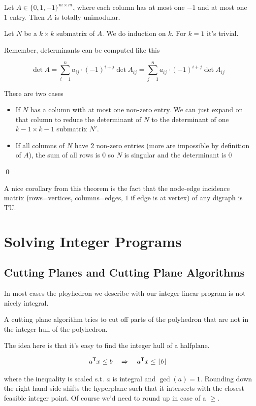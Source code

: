 \begin{thm} Let $A\in \{0,1,-1\}^{m\times m}$, where each column has at most one $-1$ and at most one $1$ entry. Then $A$ is totally unimodular.
\end{thm}

\begin{pr} Let $N$ be a $k\times k$ submatrix of $A$. We do induction on $k$. For $k=1$ it's trivial.

Remember, determinants can be computed like this

\[\det A = \sum_{i=1}^n a_{ij} \cdot (-1)^{i+j} \det A_{ij} = \sum_{j=1}^n a_{ij} \cdot (-1)^{i+j} \det A_{ij}\]

There are two cases

\begin{itemize}
\item If $N$ has a column with at most one non-zero entry. We can just expand on that column to reduce the determinant of $N$ to the determinant of one $k-1\times k-1$ submatrix $N'$.

\item If all columns of $N$ have 2 non-zero entries (more are impossible by definition of $A$), the sum of all rows is $0$ so $N$ is singular and the determinant is $0$
\end{itemize}
\qed \end{pr}

A nice corollary from this theorem is the fact that the node-edge incidence matrix (rows=vertices, columns=edges, $1$ if edge is at vertex) of any digraph is TU.

\chapter{Solving Integer Programs}
\section{Cutting Planes and Cutting Plane Algorithms}
In most cases the ployhedron we describe with our integer linear program is not nicely integral.

A cutting plane algorithm tries to cut off parts of the polyhedron that are not in the integer hull of the polyhedron.

The idea here is that it's easy to find the integer hull of a halfplane. 

\[{a}^\text{\upshape \sffamily T} x \leq b \quad \Rightarrow \quad {a}^\text{\upshape \sffamily T} x \leq \lfloor b \rfloor\]

where the inequality is scaled s.t. $a$ is integral and $\gcd(a)=1$. Rounding down the right hand side shifts the hyperplane such that it intersects with the closest feasible integer point. Of course we'd need to round up in case of a $\geq$.

